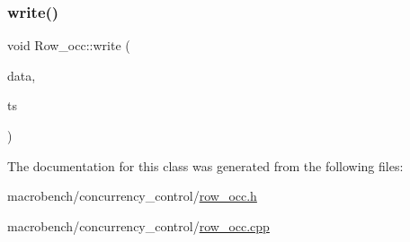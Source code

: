 \mbox{\label{classRow__occ_ab7e903b0c2d8d5b2b0f82aaa07b3559f}} 
\subsubsection{\texorpdfstring{write()}{write()}}
{\footnotesize\ttfamily void Row\+\_\+occ\+::write (\begin{DoxyParamCaption}\item[{\hyperlink{classrow__t}{row\+\_\+t} $\ast$}]{data,  }\item[{uint64\+\_\+t}]{ts }\end{DoxyParamCaption})}



The documentation for this class was generated from the following files\+:\begin{DoxyCompactItemize}
\item 
macrobench/concurrency\+\_\+control/\hyperlink{row__occ_8h}{row\+\_\+occ.\+h}\item 
macrobench/concurrency\+\_\+control/\hyperlink{row__occ_8cpp}{row\+\_\+occ.\+cpp}\end{DoxyCompactItemize}
